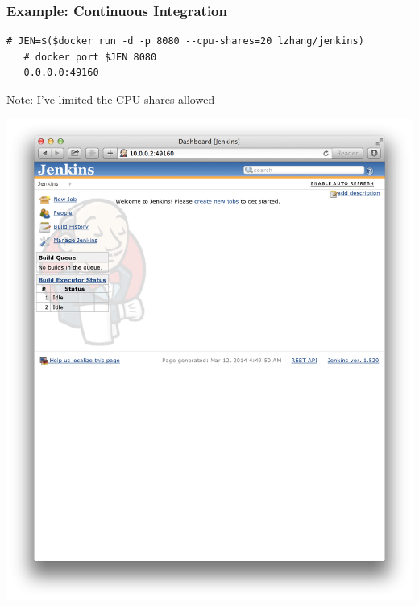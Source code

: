 \documentclass[xcolor=dvipsnames]{beamer}
\begin{document}
\begin{frame}[fragile]
  \frametitle{Example: Continuous Integration}
  \begin{lstlisting}[basicstyle=\tiny]
   # JEN=$($docker run -d -p 8080 --cpu-shares=20 lzhang/jenkins)
   # docker port $JEN 8080
   0.0.0.0:49160
  \end{lstlisting}

  Note: I've limited the CPU shares allowed
  
  \includegraphics[width=\textwidth]{figures/jenkins.png}
  
\end{frame}
\end{document}
